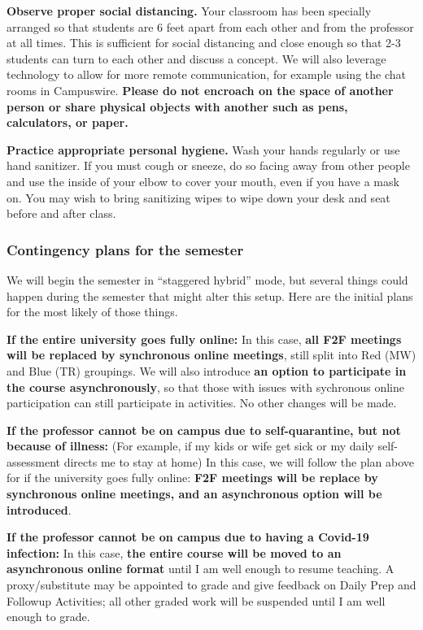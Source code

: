 \documentclass[]{article}
\begin{document}
\textbf{Observe proper social distancing.} Your classroom has been
specially arranged so that students are 6 feet apart from each other and
from the professor at all times. This is sufficient for social
distancing and close enough so that 2-3 students can turn to each other
and discuss a concept. We will also leverage technology to allow for
more remote communication, for example using the chat rooms in
Campuswire. \textbf{Please do not encroach on the space of another
person or share physical objects with another such as pens, calculators,
or paper.}

\textbf{Practice appropriate personal hygiene.} Wash your hands
regularly or use hand sanitizer. If you must cough or sneeze, do so
facing away from other people and use the inside of your elbow to cover
your mouth, even if you have a mask on. You may wish to bring sanitizing
wipes to wipe down your desk and seat before and after class.

\hypertarget{contingency-plans-for-the-semester}{%
\subsubsection{Contingency plans for the
semester}\label{contingency-plans-for-the-semester}}

We will begin the semester in ``staggered hybrid'' mode, but several
things could happen during the semester that might alter this setup.
Here are the initial plans for the most likely of those things.

\textbf{If the entire university goes fully online:} In this case,
\textbf{all F2F meetings will be replaced by synchronous online
meetings}, still split into Red (MW) and Blue (TR) groupings. We will
also introduce \textbf{an option to participate in the course
asynchronously}, so that those with issues with sychronous online
participation can still participate in activities. No other changes will
be made.

\textbf{If the professor cannot be on campus due to self-quarantine, but
not because of illness:} (For example, if my kids or wife get sick or my
daily self-assessment directs me to stay at home) In this case, we will
follow the plan above for if the university goes fully online:
\textbf{F2F meetings will be replace by synchronous online meetings, and
an asynchronous option will be introduced}.

\textbf{If the professor cannot be on campus due to having a Covid-19
infection:} In this case, \textbf{the entire course will be moved to an
asynchronous online format} until I am well enough to resume teaching. A
proxy/substitute may be appointed to grade and give feedback on Daily
Prep and Followup Activities; all other graded work will be suspended
until I am well enough to grade.
\end{document}
